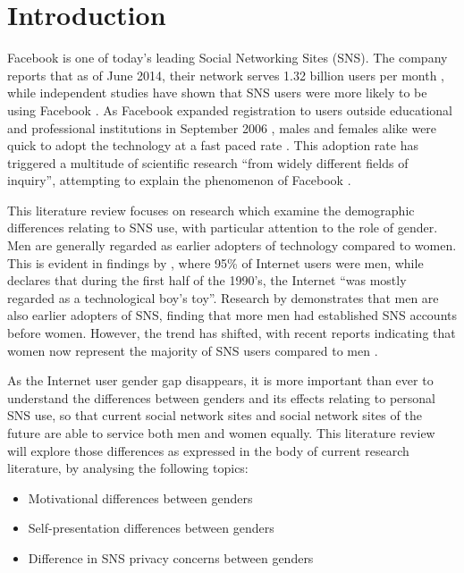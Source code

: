 \section{Introduction}

Facebook is one of today's leading Social Networking Sites (SNS). The company reports that as of June 2014, their network serves 1.32 billion users per month \citep{Facebook2014}, while independent studies have shown that SNS users were more likely to be using Facebook \citep{Hampton2011, Raacke2008, Hargittai2007}. As Facebook expanded registration to users outside educational and professional institutions in September 2006 \citep{Facebook2014}, males and females alike were quick to adopt the technology at a fast paced rate \citep{Mazman2011}. This adoption rate has triggered a multitude of scientific research ``from widely different fields of inquiry'', attempting to explain the phenomenon of Facebook \citep[p. 983]{Caers2013}. 

This literature review focuses on research which examine the demographic differences relating to SNS use, with particular attention to the role of gender. Men are generally regarded as earlier adopters of technology compared to women. This is evident in findings by \citet{Pitkow1994}, where 95\% of Internet users were men, while \citet[p. 896]{Kimbrough2013} declares that during the first half of the 1990's, the Internet ``was mostly regarded as a technological boy's toy''. Research by \citet{Fogel2009} demonstrates that men are also earlier adopters of SNS, finding that more men had established SNS accounts before women. However, the trend has shifted, with recent reports indicating that women now represent the majority of SNS users compared to men \citep{Duggan2013, Hampton2011}.

As the Internet user gender gap disappears, it is more important than ever to understand the differences between genders and its effects relating to personal SNS use, so that current social network sites and social network sites of the future are able to service both men and women equally. This literature review will explore those differences as expressed in the body of current research literature, by analysing the following topics:
\begin{itemize}
\item Motivational differences between genders
\item Self-presentation differences between genders
\item Difference in SNS privacy concerns between genders
\end{itemize}